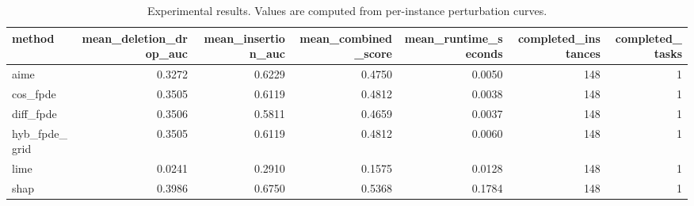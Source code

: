 \begin{table}[t]
\caption{Experimental results. Values are computed from per-instance perturbation curves.}
\label{tab:main_results_computed}
\centering
\begin{tabular}{lrrrrrr}
\toprule
method & mean\_deletion\_drop\_auc & mean\_insertion\_auc & mean\_combined\_score & mean\_runtime\_seconds & completed\_instances & completed\_tasks \\
\midrule
aime & 0.3272 & 0.6229 & 0.4750 & 0.0050 & 148 & 1 \\
cos\_fpde & 0.3505 & 0.6119 & 0.4812 & 0.0038 & 148 & 1 \\
diff\_fpde & 0.3506 & 0.5811 & 0.4659 & 0.0037 & 148 & 1 \\
hyb\_fpde\_grid & 0.3505 & 0.6119 & 0.4812 & 0.0060 & 148 & 1 \\
lime & 0.0241 & 0.2910 & 0.1575 & 0.0128 & 148 & 1 \\
shap & 0.3986 & 0.6750 & 0.5368 & 0.1784 & 148 & 1 \\
\bottomrule
\end{tabular}

\end{table}
